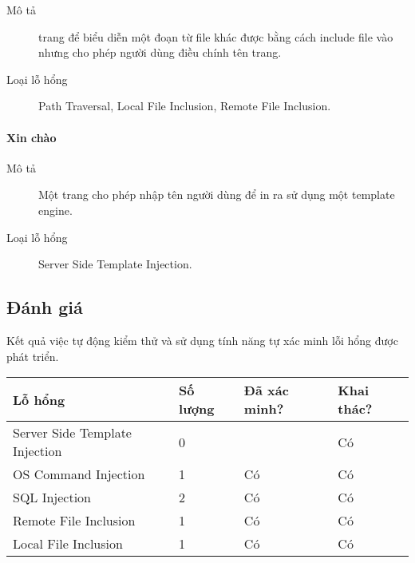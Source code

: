\documentclass[./../main.tex]{subfiles}
\begin{document}
\begin{description}
	\item[Mô tả] trang để biểu diễn một đoạn từ file khác được bằng cách include file vào nhưng cho phép người dùng điều chính tên trang.
	\item[Loại lỗ hổng] Path Traversal, Local File Inclusion, Remote File Inclusion.
\end{description}

\paragraph{Xin chào}

\begin{description}
	\item[Mô tả] Một trang cho phép nhập tên người dùng để in ra sử dụng một template engine.
	\item[Loại lỗ hổng] Server Side Template Injection.
\end{description}

\subsection{Đánh giá}

Kết quả việc tự động kiểm thử và sử dụng tính năng tự xác minh lỗi hổng được phát triển.

\begin{table}[]
	\begin{tabular}{|l|l|l|l|}
		\hline
		\textbf{Lỗ hổng}               & \textbf{Số lượng} & \textbf{Đã xác minh?} & \textbf{Khai thác?} \\ \hline
		Server Side Template Injection & 0                 &                       & Có                  \\ \hline
		OS Command Injection           & 1                 & Có                    & Có                  \\ \hline
		SQL Injection                  & 2                 & Có                    & Có                  \\ \hline
		Remote File Inclusion          & 1                 & Có                    & Có                  \\ \hline
		Local File Inclusion           & 1                 & Có                    & Có                  \\ \hline
	\end{tabular}
\end{table}
\end{document}
